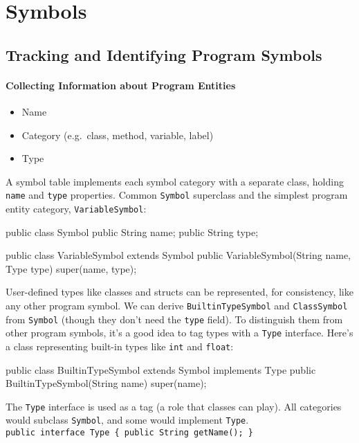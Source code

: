 \section{Symbols}


\subsection{Tracking and Identifying Program Symbols}

\paragraph{Collecting Information about Program Entities}
\begin{itemize}
\item Name
\item Category (e.g.\ class, method, variable, label)
\item Type
\end{itemize}

A symbol table implements each symbol category with a separate class,
holding \verb=name= and \verb=type= properties.
Common \verb=Symbol= superclass and the simplest program entity category,
\verb=VariableSymbol=:

\begin{verbatimtab}
public class Symbol {
	public String name;
	public String type;
}

public class VariableSymbol extends Symbol {
	public VariableSymbol(String name, Type type) {
		super(name, type);
	}
}
\end{verbatimtab}

User-defined types like classes and structs can be represented,
for consistency, like any other program symbol.
We can derive \verb=BuiltinTypeSymbol= and \verb=ClassSymbol=
from \verb=Symbol= (though they don't need the \verb=type= field).
To distinguish them from other program symbols,
it's a good idea to tag types with a \verb=Type= interface.
Here's a class representing built-in types like \verb=int= and \verb=float=:

\begin{verbatimtab}
public class BuiltinTypeSymbol extends Symbol implements Type {
	public BuiltinTypeSymbol(String name) { super(name); }
}
\end{verbatimtab}

The \verb=Type= interface is used as a tag (a role that classes can play).
All categories would subclass \verb=Symbol=,
and some would implement \verb=Type=.\\
\verb=public interface Type { public String getName(); }=

